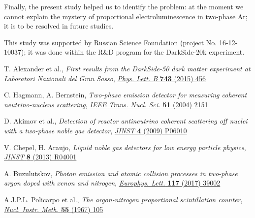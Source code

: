 \documentclass[a4paper,11pt]{article}
\begin{document}
Finally, the present study helped us to identify the problem: at the moment we cannot explain the mystery of proportional electroluminescence in two-phase Ar; it is to be resolved in future studies.

This study was supported by Russian Science Foundation (project No. 16-12-10037); it was done within the R\&D program for the DarkSide-20k experiment.


\begin{thebibliography}{99}




T. Alexander et al., \emph{First results from the DarkSide-50 dark matter experiment at Laboratori Nazionali del Gran Sasso},  \href{http://dx.doi.org/10.1016/j.physletb.2015.03.012}{\emph{Phys. Lett. B} {\bf 743} (2015) 456}

C. Hagmann, A. Bernstein, \emph{Two-phase emission detector for measuring coherent neutrino-nucleus scattering}, \href{http://doi.org/10.1109/TNS.2004.836061}{\emph{IEEE Trans. Nucl. Sci.} {\bf 51} (2004) 2151}

D. Akimov et al., \emph{Detection of reactor antineutrino coherent scattering off nuclei with a two-phase noble gas detector}, \href{http://doi.org/10.1088/1748-0221/4/06/P06010}{\emph{JINST} {\bf 4} (2009) P06010}

V. Chepel, H. Araujo, \emph{Liquid noble gas detectors for low energy particle physics}, \href{http://doi.org/10.1088/1748-0221/8/04/R04001}{\emph{JINST} {\bf 8} (2013) R04001}

A. Buzulutskov, \emph{Photon emission and atomic collision processes in two-phase argon doped with xenon and nitrogen}, \href{http://doi.org/10.1209/0295-5075/117/39002}{\emph{Europhys. Lett.} {\bf 117} (2017) 39002}

A.J.P.L. Policarpo et al., \emph{The argon-nitrogen proportional scintillation counter}, \href{http://doi.org/10.1016/0029-554X(67)90112-7}{\emph{Nucl. Instr. Meth.} {\bf 55} (1967) 105}


\end{thebibliography}
\end{document}
